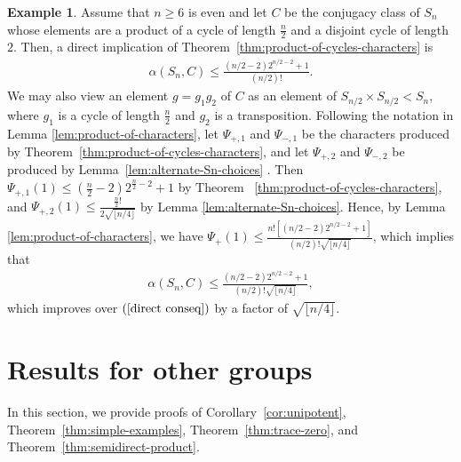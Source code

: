\documentclass[12pt]{amsart}
\theoremstyle{definition} \newtheorem{definition}[theorem]{Definition}
\theoremstyle{example} \newtheorem{example}[theorem]{Example}
\theoremstyle{remark} \newtheorem{remark}{Remark}[theorem]
\numberwithin{equation}{section}
\numberwithin{theorem}{section}
\renewcommand{\leq}{\leqslant}
\renewcommand{\geq}{\geqslant}
\begin{document}
	\begin{example} \rm
		Assume that $n\geq 6$ is even and let $C$ be the conjugacy class of $S_n$ whose elements are a product of a cycle of length $\frac{n}{2}$ and a disjoint cycle of length $2$. Then, a direct implication of Theorem~\ref{thm:product-of-cycles-characters} is 
		\begin{align} \label{direct conseq}
			\alpha(S_n,C) \leq \frac{(n/2-2)2^{n/2-2}+1}{(n/2)!}.
		\end{align} 
		We may also view an element $g=g_1 g_2$ of $C$ as an element of $S_{n/2} \times S_{n/2} < S_n$, where $g_1$ is a cycle of length $\frac{n}{2}$ and $g_2$ is a transposition.  Following the notation in Lemma \ref{lem:product-of-characters}, let $\Psi_{+,1}$ and $\Psi_{-,1}$ be the characters produced by Theorem~\ref{thm:product-of-cycles-characters}, and let $\Psi_{+,2}$ and $\Psi_{-,2}$ be produced by Lemma~\ref{lem:alternate-Sn-choices} . Then $\Psi_{+,1}(1) \leq \left( \frac{n}{2}-2 \right)2^{\frac{n}{2}-2}+1$ by Theorem ~\ref{thm:product-of-cycles-characters}, and $\Psi_{+,2}(1) \leq \frac{\frac{n}{2}!}{2\sqrt{\lfloor n/4 \rfloor}}$ by Lemma \ref{lem:alternate-Sn-choices}. Hence, by Lemma \ref{lem:product-of-characters}, we have $\Psi_{+}(1)\leq \frac{n!\left[(n/2-2)2^{n/2-2}+1 \right]}{(n/2)!\sqrt{\lfloor n/4 \rfloor}}$, which implies that 
		\begin{align*}
			\alpha(S_n,C) \leq \frac{(n/2-2)2^{n/2-2}+1}{(n/2)!\sqrt{\lfloor n/4 \rfloor}},
		\end{align*}
		which improves over $(\ref{direct conseq})$ by a factor of $\sqrt{\lfloor n/4 \rfloor}$. 
	\end{example}
	
\section{Results for other groups}
	\label{sec:other-groups}

	In this section, we provide proofs of Corollary~\ref{cor:unipotent}, Theorem~\ref{thm:simple-examples}, Theorem~\ref{thm:trace-zero}, and Theorem~\ref{thm:semidirect-product}.
	
\end{document}

